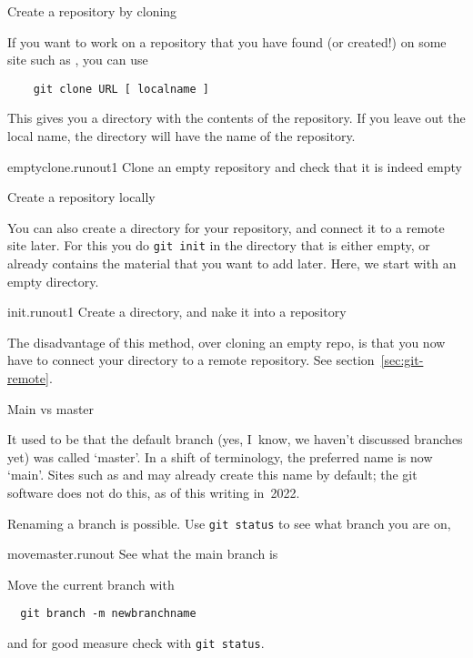  {Create a repository by cloning}

If you want to work on a repository that you have found (or created!)
on some site such as , you can use
\begin{lstlisting}
    git clone URL [ localname ]
\end{lstlisting}
This gives you a directory with the contents of the repository.
If you leave out the local name, the directory will have the name
of the repository.

\begin{gitstep}{emptyclone.runout1}
  Clone an empty repository and check that it is indeed empty
\end{gitstep}

\newpage
{} {Create a repository locally}

You can also create a directory for your repository,
  and connect it to a remote site later.
  For this you do \lstinline{git init}
  in the directory that is either empty,
  or already contains the material that you want to add later.
  Here, we start with an empty directory.

\begin{gitstep}{init.runout1}
  Create a directory, and nake it into a repository
\end{gitstep}

The disadvantage of this method,
over cloning an empty repo,
is that you now have to connect your directory to a remote repository.
See section~\ref{sec:git-remote}.

\newpage
{} {Main vs master}

It used to be that the default branch
(yes, I~know, we haven't discussed branches yet)
was called `master'.
In a shift of terminology, the preferred name is now `main'.
Sites such as  and 
may already create this name by default;
the git software does not do this, as of this writing in~2022.

Renaming a branch is possible.
  Use \lstinline{git status} to see what branch you are on,

\begin{gitstep}{movemaster.runout}
  See what the main branch is
\end{gitstep}

Move the current branch with
\begin{lstlisting}
  git branch -m newbranchname
\end{lstlisting}
and for good measure check with \lstinline{git status}.

